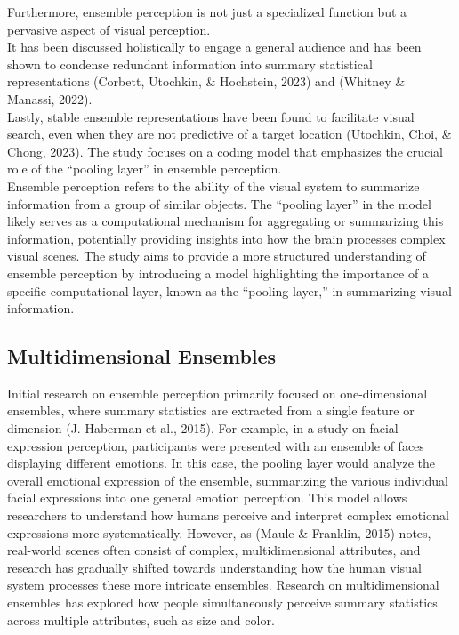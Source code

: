 \documentclass[print]{nuthesis}
\begin{document}
Furthermore, ensemble perception is not just a specialized function but a pervasive aspect of visual perception.\\
It has been discussed holistically to engage a general audience and has been shown to condense redundant information into summary statistical representations (Corbett, Utochkin, \& Hochstein, 2023) and (Whitney \& Manassi, 2022).\\
Lastly, stable ensemble representations have been found to facilitate visual search, even when they are not predictive of a target location (Utochkin, Choi, \& Chong, 2023).
The study focuses on a coding model that emphasizes the crucial role of the ``pooling layer'' in ensemble perception.\\
Ensemble perception refers to the ability of the visual system to summarize information from a group of similar objects.
The ``pooling layer'' in the model likely serves as a computational mechanism for aggregating or summarizing this information, potentially providing insights into how the brain processes complex visual scenes.
The study aims to provide a more structured understanding of ensemble perception by introducing a model highlighting the importance of a specific computational layer, known as the ``pooling layer,'' in summarizing visual information.

\hypertarget{multidimensional-ensembles}{%
\subsection{Multidimensional Ensembles}\label{multidimensional-ensembles}}

Initial research on ensemble perception primarily focused on one-dimensional ensembles, where summary statistics are extracted from a single feature or dimension (J. Haberman et al., 2015).
For example, in a study on facial expression perception, participants were presented with an ensemble of faces displaying different emotions.
In this case, the pooling layer would analyze the overall emotional expression of the ensemble, summarizing the various individual facial expressions into one general emotion perception.
This model allows researchers to understand how humans perceive and interpret complex emotional expressions more systematically.
However, as (Maule \& Franklin, 2015) notes, real-world scenes often consist of complex, multidimensional attributes, and research has gradually shifted towards understanding how the human visual system processes these more intricate ensembles.
Research on multidimensional ensembles has explored how people simultaneously perceive summary statistics across multiple attributes, such as size and color.
\end{document}
